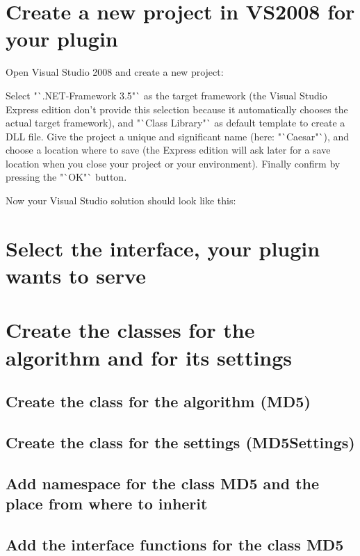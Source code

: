 \section{Create a new project in VS2008 for your plugin}\label{sec:CreateANewProjectInVS2008ForYourPlugin}
Open Visual Studio 2008 and create a new project:



Select "`.NET-Framework 3.5"` as the target framework (the Visual Studio Express edition don't provide this selection because it automatically chooses the actual target framework), and "`Class Library"` as default template to create a DLL file. Give the project a unique and significant name (here: "`Caesar"`), and choose a location where to save (the Express edition will ask later for a save location when you close your project or your environment).  Finally confirm by pressing the "`OK"` button.




Now your Visual Studio solution should look like this:





\section{Select the interface, your plugin wants to serve}\label{sec:SelectTheInterfaceYourPluginWantsToServe}
\section{Create the classes for the algorithm and for its settings}\label{sec:CreateTheClassesForTheAlgorithmAndForItsSettings}
\subsection{Create the class for the algorithm (MD5)}\label{sec:CreateTheClassForTheAlgorithmMD5}
\subsection{Create the class for the settings (MD5Settings)}\label{sec:CreateTheClassForTheSettingsMD5Settings}
\subsection{Add namespace for the class MD5 and the place from where to inherit}
\label{sec:AddNamespaceForTheClassMD5AndThePlaceFromWhereToInherit}
\subsection{Add the interface functions for the class MD5}\label{sec:AddTheInterfaceFunctionsForTheClassMD5}
